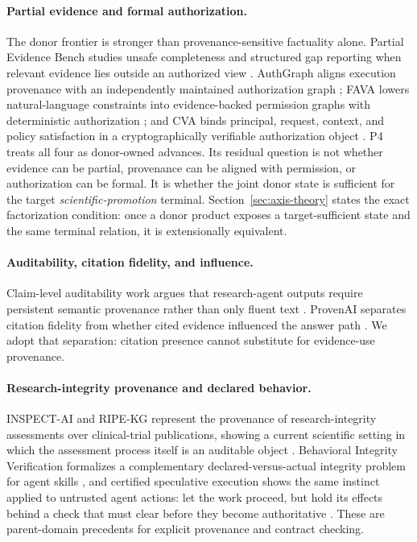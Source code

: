 \paragraph{Partial evidence and formal authorization.}
The donor frontier is stronger than provenance-sensitive factuality alone.  Partial Evidence Bench studies unsafe completeness and structured gap reporting when relevant evidence lies outside an authorized view \citep{partial2026}.  AuthGraph aligns execution provenance with an independently maintained authorization graph \citep{authgraph2026}; FAVA lowers natural-language constraints into evidence-backed permission graphs with deterministic authorization \citep{fava2026}; and CVA binds principal, request, context, and policy satisfaction in a cryptographically verifiable authorization object \citep{cva2026}.  P4 treats all four as donor-owned advances.  Its residual question is not whether evidence can be partial, provenance can be aligned with permission, or authorization can be formal.  It is whether the joint donor state is sufficient for the target \emph{scientific-promotion} terminal.  Section~\ref{sec:axis-theory} states the exact factorization condition: once a donor product exposes a target-sufficient state and the same terminal relation, it is extensionally equivalent.

\paragraph{Auditability, citation fidelity, and influence.}
Claim-level auditability work argues that research-agent outputs require persistent semantic provenance rather than only fluent text \citep{aar2026}. ProvenAI separates citation fidelity from whether cited evidence influenced the answer path \citep{provenai2026}. We adopt that separation: citation presence cannot substitute for evidence-use provenance.

\paragraph{Research-integrity provenance and declared behavior.}
INSPECT-AI and RIPE-KG represent the provenance of research-integrity assessments over clinical-trial publications, showing a current scientific setting in which the assessment process itself is an auditable object \citep{inspectai2026}. Behavioral Integrity Verification formalizes a complementary declared-versus-actual integrity problem for agent skills \citep{behavioralintegrity2026}, and certified speculative execution shows the same instinct applied to untrusted agent actions: let the work proceed, but hold its effects behind a check that must clear before they become authoritative \citep{certifiedspeculative2026}. These are parent-domain precedents for explicit provenance and contract checking.

